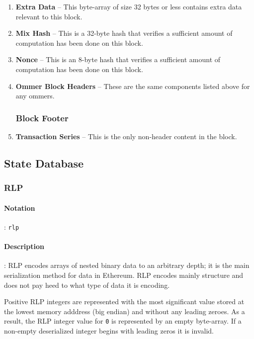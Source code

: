 \documentclass[10pt,a4paper,leqno,bibliography=totoc]{scrartcl}
\newenvironment{alphafootnotes}
{\par\edef\savedfootnotenumber{\number\value{footnote}}
\renewcommand{\thefootnote}{\alph{footnote}}
\setcounter{footnote}{0}}
{\par\setcounter{footnote}{\savedfootnotenumber}}
\begin{document}
\begin{alphafootnotes}
\begin{multicols*}{2}
\begin{enumerate}
					\item \textbf{Extra Data} -- This byte-array of size 32 bytes or less contains extra data relevant to this block.
					\item \textbf{Mix Hash} -- This is a 32-byte hash that verifies a sufficient amount of computation has been done on this block.
					\item \textbf{Nonce} -- This is an 8-byte hash that verifies a sufficient amount of computation has been done on this block.
					\item \textbf{Ommer Block Headers} -- These are the same components listed above for any ommers.
				
					\subsubsection{Block Footer}
					\item \textbf{Transaction Series} -- This is the only non-header content in the block.
				\end{enumerate}

		\subsection{State Database}


			\subsubsection{RLP}
			\paragraph{Notation}: \texttt{rlp}
			\paragraph{Description}: RLP encodes arrays of nested binary data to an arbitrary depth; it is the main serialization method for data in Ethereum. RLP encodes mainly structure and does not pay heed to what type of data it is encoding. 
			\par

		Positive RLP integers are represented with the most significant value stored at the lowest memory adddress (big endian)  and without any leading zeroes. As a result, the RLP integer value for \texttt{0} is represented by an empty byte-array. If a non-empty deserialized integer begins with leading zeros it is invalid.\supercite{EF2017}
			\par


\end{multicols*}
\end{alphafootnotes}
\end{document}
